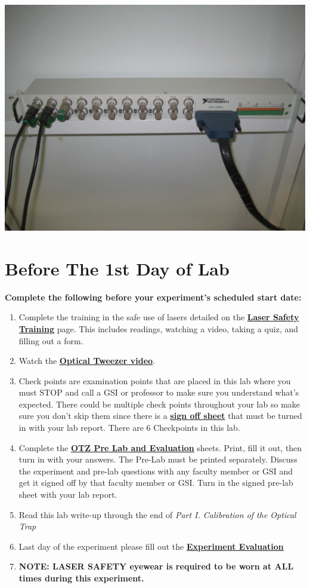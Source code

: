 \documentclass{../lab}
\begin{document}
\href{http://experimentationlab.berkeley.edu/sites/default/files/images/OTZ_DAQ_Interface_3554.jpg}{\includegraphics[width=0.33\linewidth,keepaspectratio]{images/OTZ_DAQ_Interface_3554.jpg}}

\section{Before The 1st Day of Lab}

\textbf{Complete the following before your experiment's scheduled start date:}

\begin{enumerate}
    \item Complete the training in the safe use of lasers detailed on the \href{http://experimentationlab.berkeley.edu/LaserSafety}{\textbf{Laser Safety Training}} page. This includes readings, watching a video, taking a quiz, and filling out a form.

    \item Watch the \href{http://youtu.be/bqIBcjcAhso}{\textbf{Optical Tweezer video}}.

    \item Check points are examination points that are placed in this lab where you must STOP and call a GSI or professor to make sure you understand what's expected. There could  be multiple check points throughout your lab so make sure you don't skip them since there is a \href{http://experimentationlab.berkeley.edu/otzcheckpoints}{\textbf{sign off sheet}} that must be turned in with your lab report. There are 6 Checkpoints in this lab.

    \item Complete the \href{http://experimentationlab.berkeley.edu/OTZprelab}{\textbf{OTZ Pre Lab and Evaluation}} sheets. Print, fill it out, then turn in with your answers. The Pre-Lab must be printed separately. Discuss the experiment and pre-lab questions with any faculty member or GSI and get it signed off by that faculty member or GSI. Turn in the signed pre-lab sheet with your lab report.

    \item Read this lab write-up through the end of \emph{Part I. Calibration of the Optical Trap}

    \item Last day of the experiment please fill out the \href{\ExperimentEvaluation}{\textbf{Experiment Evaluation}}

    \item \textbf{NOTE: LASER  SAFETY eyewear is required to be worn at ALL times during this experiment.}

\end{enumerate}
\end{document}
